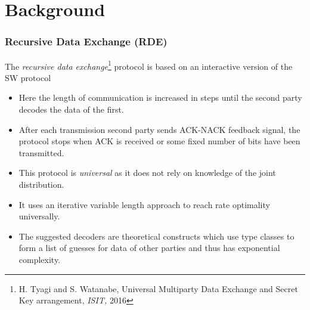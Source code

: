 \documentclass[xcolor=dvipsnames]{beamer}
\begin{document}
\section{Background}

\begin{frame}[label = rde]
\frametitle{Recursive Data Exchange (RDE)}
The \emph{recursive data exchange}\footnote{\tiny H. Tyagi and S. Watanabe, Universal Multiparty Data Exchange and Secret Key arrangement, \textit{ISIT,} 2016} protocol is based on an interactive version of the SW protocol 
\begin{itemize}
\item Here the length of communication is increased in steps until the second party decodes the data of the first.
\item After each transmission second party sends ACK-NACK feedback signal, the protocol stops when ACK is received or some fixed number of bits have been transmitted.
\item This protocol is \emph{universal} as it does not rely on knowledge of the joint distribution.
\item It uses an iterative variable length approach to reach rate optimality universally. 
\item The suggested decoders are theoretical constructs which use type classes to form a list of guesses for data of other parties and thus has exponential complexity.
\end{itemize}
\end{frame}
\end{document}
